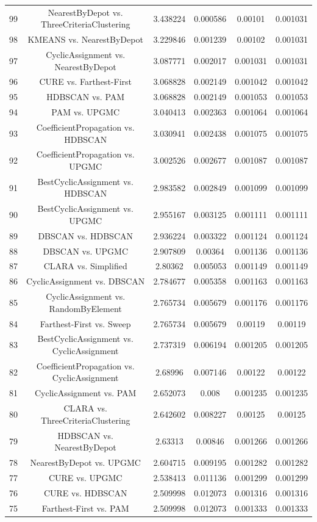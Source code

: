 \documentclass[a4paper,10pt]{article}
\begin{document}
\begin{landscape}
\begin{table}[!htp]
\begin{tabular}{cccccc}
99&NearestByDepot vs. ThreeCriteriaClustering&3.438224&0.000586&0.00101&0.001031\\
98&KMEANS vs. NearestByDepot&3.229846&0.001239&0.00102&0.001031\\
97&CyclicAssignment vs. NearestByDepot&3.087771&0.002017&0.001031&0.001031\\
96&CURE vs. Farthest-First&3.068828&0.002149&0.001042&0.001042\\
95&HDBSCAN vs. PAM&3.068828&0.002149&0.001053&0.001053\\
94&PAM vs. UPGMC&3.040413&0.002363&0.001064&0.001064\\
93&CoefficientPropagation vs. HDBSCAN&3.030941&0.002438&0.001075&0.001075\\
92&CoefficientPropagation vs. UPGMC&3.002526&0.002677&0.001087&0.001087\\
91&BestCyclicAssignment vs. HDBSCAN&2.983582&0.002849&0.001099&0.001099\\
90&BestCyclicAssignment vs. UPGMC&2.955167&0.003125&0.001111&0.001111\\
89&DBSCAN vs. HDBSCAN&2.936224&0.003322&0.001124&0.001124\\
88&DBSCAN vs. UPGMC&2.907809&0.00364&0.001136&0.001136\\
87&CLARA vs. Simplified&2.80362&0.005053&0.001149&0.001149\\
86&CyclicAssignment vs. DBSCAN&2.784677&0.005358&0.001163&0.001163\\
85&CyclicAssignment vs. RandomByElement&2.765734&0.005679&0.001176&0.001176\\
84&Farthest-First vs. Sweep&2.765734&0.005679&0.00119&0.00119\\
83&BestCyclicAssignment vs. CyclicAssignment&2.737319&0.006194&0.001205&0.001205\\
82&CoefficientPropagation vs. CyclicAssignment&2.68996&0.007146&0.00122&0.00122\\
81&CyclicAssignment vs. PAM&2.652073&0.008&0.001235&0.001235\\
80&CLARA vs. ThreeCriteriaClustering&2.642602&0.008227&0.00125&0.00125\\
79&HDBSCAN vs. NearestByDepot&2.63313&0.00846&0.001266&0.001266\\
78&NearestByDepot vs. UPGMC&2.604715&0.009195&0.001282&0.001282\\
77&CURE vs. UPGMC&2.538413&0.011136&0.001299&0.001299\\
76&CURE vs. HDBSCAN&2.509998&0.012073&0.001316&0.001316\\
75&Farthest-First vs. PAM&2.509998&0.012073&0.001333&0.001333\\

\end{tabular}
\end{table}
\end{landscape}
\end{document}
